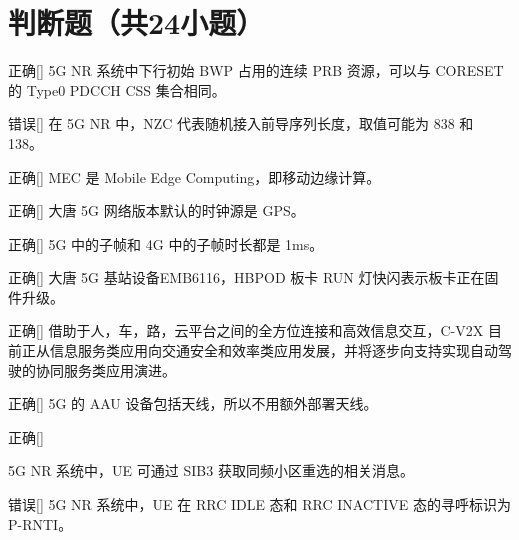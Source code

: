 \section{判断题（共24小题）}

\begin{choice}{\;正确\;}[]
    5G NR 系统中下行初始 BWP 占用的连续 PRB 资源，可以与 CORESET 的 Type0 PDCCH CSS 集合相同。
\end{choice}


\begin{choice}{\;错误\;}[]
    在 5G NR 中，NZC 代表随机接入前导序列长度，取值可能为 838 和 138。
\end{choice}

\begin{choice}{\;正确\;}[]
    MEC 是 Mobile Edge Computing，即移动边缘计算。
\end{choice}

\begin{choice}{\;正确\;}[]
    大唐 5G 网络版本默认的时钟源是 GPS。
\end{choice}

\begin{choice}{\;正确\;}[]
    5G 中的子帧和 4G 中的子帧时长都是 1ms。
\end{choice}

\begin{choice}{\;正确\;}[]
    大唐 5G 基站设备EMB6116，HBPOD 板卡 RUN 灯快闪表示板卡正在固件升级。

\end{choice}


\begin{choice}{\;正确\;}[]
    借助于人，车，路，云平台之间的全方位连接和高效信息交互，C-V2X 目前正从信息服务类应用向交通安全和效率类应用发展，并将逐步向支持实现自动驾驶的协同服务类应用演进。

\end{choice}

\begin{choice}{\;正确\;}[]
    5G 的 AAU 设备包括天线，所以不用额外部署天线。

\end{choice}

\begin{choice}{\;正确\;}[]

    5G NR 系统中，UE 可通过 SIB3 获取同频小区重选的相关消息。
\end{choice}


\begin{choice}{\;错误\;}[]
    5G NR 系统中，UE 在 RRC IDLE 态和 RRC INACTIVE 态的寻呼标识为 P-RNTI。

\end{choice}

